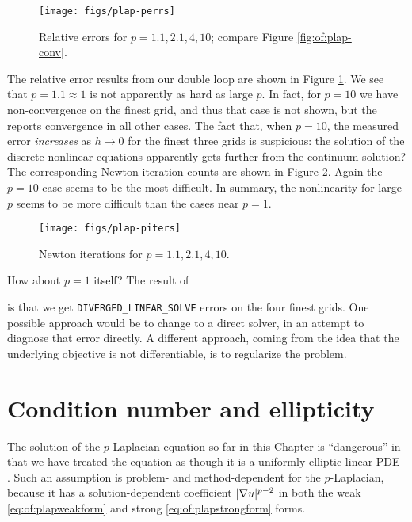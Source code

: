 \begin{figure}
\texttt{[image: figs/plap-perrs]}
\caption{Relative errors for $p=1.1,2.1,4,10$; compare Figure \ref{fig:of:plap-conv}.}
\label{fig:of:plap-perrs}
\end{figure}

The relative error results from our double loop are shown in Figure \ref{fig:of:plap-perrs}.  We see that $p = 1.1 \approx 1$ is not apparently as hard as large $p$.  In fact, for $p=10$ we have non-convergence on the finest grid, and thus that case is not shown, but the \pSNES reports convergence in all other cases.  The fact that, when $p=10$, the measured error \emph{increases} as $h\to 0$ for the finest three grids is suspicious: the solution of the discrete nonlinear equations apparently gets further from the continuum solution?  The corresponding Newton iteration counts are shown in Figure \ref{fig:of:plap-piters}.  Again the $p=10$ case seems to be the most difficult.  In summary, the nonlinearity for large $p$ seems to be more difficult than the cases near $p=1$.

\begin{figure}
\texttt{[image: figs/plap-piters]}
\caption{Newton iterations for $p=1.1,2.1,4,10$.}
\label{fig:of:plap-piters}
\end{figure}

How about $p=1$ itself?  The result of
is that we get \texttt{DIVERGED\_LINEAR\_SOLVE} errors on the four finest grids.  One possible approach would be to change to a direct solver, in an attempt to diagnose that error directly.  A different approach, coming from the idea that the underlying objective is not differentiable, is to regularize the problem.


\section{Condition number and ellipticity}  \label{page:of:condellip}

The solution of the $p$-Laplacian equation so far in this Chapter is ``dangerous'' in that we have treated the equation as though it is a uniformly-elliptic linear PDE \citep{Evans2010}.  Such an assumption is problem- and method-dependent for the $p$-Laplacian, because it has a solution-dependent coefficient $|\nabla u|^{p-2}$ in both the weak \eqref{eq:of:plapweakform} and strong \eqref{eq:of:plapstrongform} forms.

